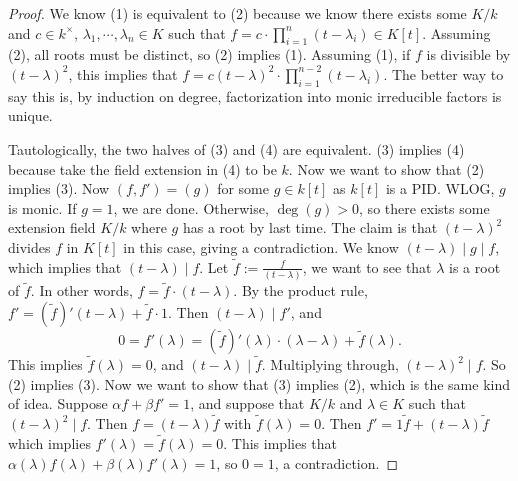 \begin{proof}
    We know (1) is equivalent to (2) because we know there exists some $K / k$ and $c \in  k ^{\times }$, $\lambda_1, \cdots , \lambda_n  \in K$ such that $f=c \cdot \prod _{i=1}^n  (t- \lambda_i ) \in  K[t]$. Assuming (2), all roots must be distinct, so (2) implies (1). Assuming (1), if $f$ is divisible by $(t-\lambda)^2$, this implies that $f=c (t-\lambda)^2 \cdot \prod _{i=1}^{n-2}(t-\lambda_i )$. The better way to say this is, by induction on degree, factorization into monic irreducible factors is unique.

    Tautologically, the two halves of (3) and (4) are equivalent. (3) implies (4) because take the field extension in (4) to be $k$. Now we want to show that (2) implies (3). Now $(f, f')=(g)$ for some $g \in k[t]$ as $k[t]$ is a PID. WLOG, $g$ is monic. If $g=1$, we are done. Otherwise, $\deg(g)>0$, so there exists some extension field $K /k$ where $g$ has a root by last time. The claim is that $(t-\lambda)^2$ divides $f$ in $K[t]$ in this case, giving a contradiction.
    We know $(t-\lambda) \mid g \mid f$, which implies that $(t-\lambda)\mid f$. Let $\widetilde f:= \frac{f}{(t-\lambda)}$, we want to see that $\lambda$ is a root of $\widetilde f$. In other words, $f=\widetilde f\cdot (t-\lambda)$. By the product rule, $f'=(\widetilde f)'(t-\lambda)+\widetilde f\cdot 1$. Then $(t-\lambda)\mid f'$, and \[
        0=f'(\lambda)=(\widetilde f)'(\lambda)\cdot (\lambda-\lambda)+\widetilde f(\lambda).
    \] This implies $\widetilde f(\lambda)=0$, and $(t-\lambda) \mid  \widetilde f$. Multiplying through, $(t-\lambda)^2\mid f$. So (2) implies (3). Now we want to show that (3) implies (2), which is the same kind of idea. Suppose $\alpha  f +\beta  f'=1$, and suppose that $K / k$ and $\lambda\in K$ such that $(t-\lambda)^2 \mid f$. Then $f=(t-\lambda) \widetilde f$ with $\widetilde f(\lambda)=0$. Then $f'=1 \widetilde f +(t-\lambda)\widetilde f$ which implies $f'(\lambda)=\widetilde f(\lambda)=0$. This implies that $\alpha (\lambda)f(\lambda)+\beta (\lambda)f'(\lambda)=1$, so $0=1$, a contradiction.


\end{proof}
